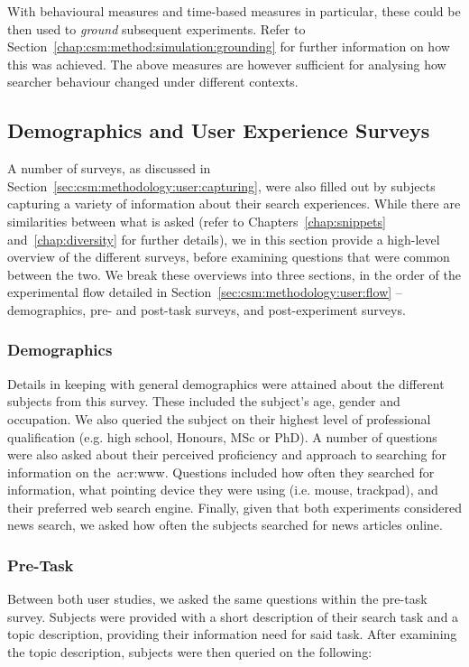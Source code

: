  With behavioural measures and time-based measures in particular, these could be then used to \emph{ground} subsequent experiments. Refer to Section~\ref{chap:csm:method:simulation:grounding} for further information on how this was achieved. The above measures are however sufficient for analysing how searcher behaviour changed under different contexts.

\subsection{Demographics and User Experience Surveys}\label{sec:csm:methodology:extracting:user}
A number of surveys, as discussed in Section~\ref{sec:csm:methodology:user:capturing}, were also filled out by subjects capturing a variety of information about their search experiences. While there are similarities between what is asked (refer to Chapters~\ref{chap:snippets} and~\ref{chap:diversity} for further details), we in this section provide a high-level overview of the different surveys, before examining questions that were common between the two. We break these overviews into three sections, in the order of the experimental flow detailed in Section~\ref{sec:csm:methodology:user:flow} -- demographics, pre- and post-task surveys, and post-experiment surveys.

\subsubsection{Demographics}
Details in keeping with general demographics were attained about the different subjects from this survey. These included the subject's age, gender and occupation. We also queried the subject on their highest level of professional qualification (e.g. high school, Honours, MSc or PhD). A number of questions were also asked about their perceived proficiency and approach to searching for information on the~\gls{acr:www}. Questions included how often they searched for information, what pointing device they were using (i.e. mouse, trackpad), and their preferred web search engine. Finally, given that both experiments considered news search, we asked how often the subjects searched for news articles online.

\subsubsection{Pre-Task}
Between both user studies, we asked the same questions within the pre-task survey. Subjects were provided with a short description of their search task and a topic description, providing their information need for said task. After examining the topic description, subjects were then queried on the following:


